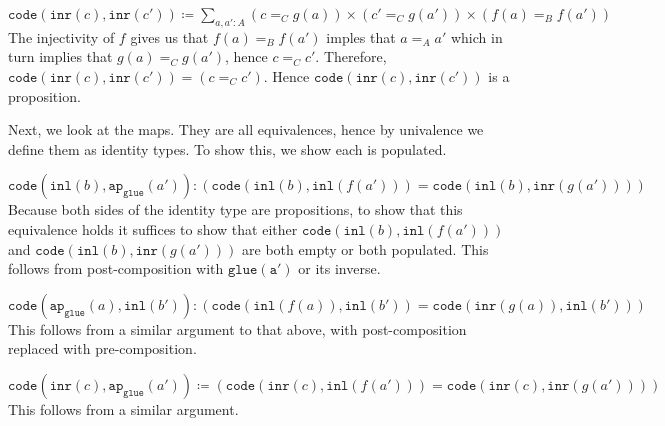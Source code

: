 \documentclass[11pt]{amsart}
\newcommand{\type}[1]{\mathtt{#1}}
\begin{document}
\vspace{2em}

$
\type{ code } \left( \type{ inr } ( c ) , \type{ inr } ( c' ) \right) \coloneqq
	\sum_{ a , a' : A } ( c =_C g ( a ) ) \times ( c' =_C g ( a' ) ) \times ( f ( a ) =_B f ( a' ) )
$ 	
The injectivity of $f$ gives us that 
	$ f ( a ) =_B f ( a' ) $
imples that 
	$ a =_A a'$
which in turn implies that
	$ g ( a ) =_C g ( a' )$,
hence 
	$ c =_C c'$.
Therefore, 
$
\type{ code } \left( \type{ inr } ( c ) , \type{ inr } ( c' ) \right) =	
	\left( c =_C c'  \right). 
$
Hence 
$ \type{ code } \left( \type{ inr } ( c ) , \type{ inr } ( c' ) \right) $
is a proposition.	

\vspace{2em}

Next, we look at the maps. 
They are all equivalences, hence by univalence
we define them as identity types. 
To show this, we show each is populated.

\vspace{2em}

$ 
\type{ code } \left( \type{ inl } ( b ) , \type{ ap }_{ \type{ glue } } ( a' ) \right) \colon
	\left(
		\type{ code } ( \type{ inl } ( b ) , \type{ inl } ( f ( a' ) ) ) =
		\type{ code } ( \type{ inl } ( b ) , \type{ inr } ( g ( a' ) ) ) 
	\right)
$
Because both sides of the identity type are propositions,
to show that this equivalence holds
it suffices to show that either
$\type{ code } ( \type{ inl } ( b ) , \type{ inl } ( f ( a' ) ) )$
and
$\type{ code } ( \type{ inl } ( b ) , \type{ inr } ( g ( a' ) ) )$
are both empty or both populated.
This follows from post-composition with
$ \type{ glue ( a' ) }$
or its inverse.

\vspace{2em}

$ 
\type{ code } \left( \type{ ap }_{ \type{ glue } } ( a ) , \type{ inl } ( b' ) \right) \colon
	\left(
		\type{ code } ( \type{ inl } ( f ( a ) ) , \type{ inl } ( b' ) ) =
		\type{ code } ( \type{ inr } ( g ( a ) ), \type{ inl } ( b' ) ) 
	\right)
$
This follows from a similar argument to that above, 
with post-composition replaced with pre-composition.

\vspace{2em}

$ 
\type{ code } \left( \type{ inr } ( c ) , \type{ ap }_{ \type{ glue } } ( a' ) \right) \coloneqq
	\left( 
		\type{ code } ( \type{ inr } ( c ) , \type{ inl } ( f ( a' ) ) ) =
		\type{ code } ( \type{ inr } ( c ) , \type{ inr } ( g ( a' ) ) ) 
	\right) 
$ 
This follows from a similar argument.
\end{document}

